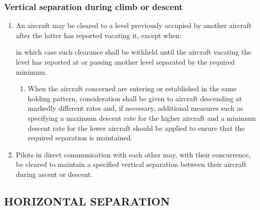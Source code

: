 \subsubsection{Vertical separation during climb or descent}

\begin{enumerate}
    \item An aircraft may be cleared to a level previously occupied by another aircraft after the latter has reported vacating it, except when:

    \noindent in which case such clearance shall be withheld until the aircraft vacating the level has reported at or passing another level separated by the required minimum.

    \begin{enumerate}
        \item When the aircraft concerned are entering or established in the same holding pattern, consideration shall be given to aircraft descending at markedly different rates and, if necessary, additional measures such as specifying a maximum descent rate for the higher aircraft and a minimum descent rate for the lower aircraft should be applied to ensure that the required separation is maintained.
    \end{enumerate}

    \item Pilots in direct communication with each other may, with their concurrence, be cleared to maintain a specified vertical separation between their aircraft during ascent or descent.
\end{enumerate}

\subsection[Horizontal separation]{HORIZONTAL SEPARATION}

